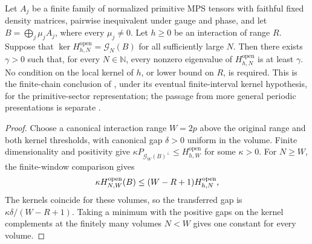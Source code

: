 \begin{lemma}
    \label{thm:eventual_kernel_open_interaction_gap}
    \leanok
    Let $A_j$ be a finite family of normalized primitive MPS tensors with
    faithful fixed density matrices, pairwise inequivalent under gauge and
    phase, and let $B=\bigoplus_j\mu_jA_j$, where every $\mu_j\ne0$.
    Let $h\geq0$ be an interaction of range $R$.
    Suppose that $\ker H^{\mathrm{open}}_{h,N}=\mathcal G_N(B)$
    for all sufficiently large $N$. Then there exists $\gamma>0$ such that,
    for every $N\in\mathbb N$, every nonzero eigenvalue of
    $H^{\mathrm{open}}_{h,N}$ is at least $\gamma$.
    No condition on the local kernel of $h$, or lower bound on $R$,
    is required. This is the finite-chain conclusion of
    \cite[Theorem~1.2]{Nachtergaele1996Spectral}, under its eventual
    finite-interval kernel hypothesis, for the primitive-sector representation;
    the passage from more general periodic presentations is separate
    \cite{gap:nachtergaele96_infinite_volume_ground_projection}.
\end{lemma}
\begin{proof}\leanok
    Choose a canonical interaction range $W=2p$ above the original range
    and both kernel thresholds, with canonical gap $\delta>0$ uniform in
    the volume. Finite dimensionality and positivity give
    $\kappa P_{\mathcal G_W(B)^\perp}\leq H^{\mathrm{open}}_{h,W}$
    for some $\kappa>0$. For $N\geq W$, the finite-window comparison gives
    \begin{align}
        \kappa H^{\mathrm{open}}_{N,W}(B)
        \leq (W-R+1)H^{\mathrm{open}}_{h,N},
        \notag
    \end{align}
    The kernels coincide for these volumes, so the transferred gap is
    $\kappa\delta/(W-R+1)$. Taking a minimum with the positive gaps
    on the kernel complements at the finitely many volumes $N<W$
    gives one constant for every volume.
\end{proof}

